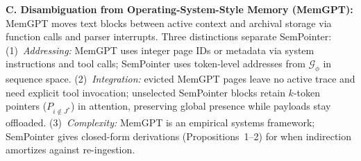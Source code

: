 \documentclass[conference]{IEEEtran}
\begin{document}
{\noindent\textbf{C. Disambiguation from Operating-System-Style Memory (MemGPT):}
MemGPT \cite{packer2023memgpt} moves text blocks between active context and archival storage via function calls and parser interrupts. Three distinctions separate SemPointer: (1)~\emph{Addressing:} MemGPT uses integer page IDs or metadata via system instructions and tool calls; SemPointer uses token-level addresses from $\mathcal{G}_\phi$ in sequence space. (2)~\emph{Integration:} evicted MemGPT pages leave no active trace and need explicit tool invocation; unselected SemPointer blocks retain $k$-token pointers ($P_{i \notin J^*}$) in attention, preserving global presence while payloads stay offloaded. (3)~\emph{Complexity:} MemGPT is an empirical systems framework; SemPointer gives closed-form derivations (Propositions~1--2) for when indirection amortizes against re-ingestion.

}
\end{document}
